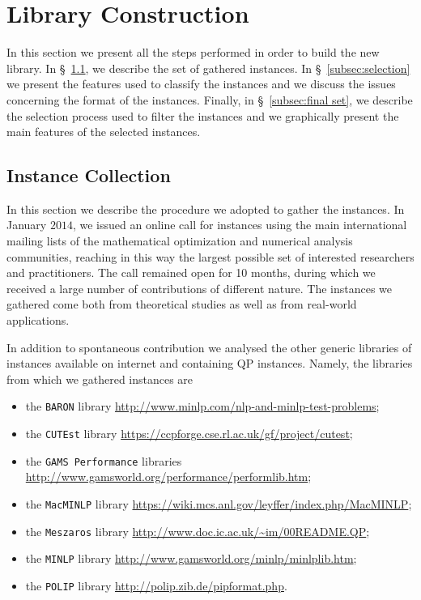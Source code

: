 \section{Library Construction}\label{sec:lib}

In this section we present all the steps performed in order to build the
new library. In \S~\ref{subsec:instColl}, we describe the set of gathered
instances. In \S~\ref{subsec:selection} we present the features used to
classify the instances and we discuss the issues concerning the format of
the instances. Finally, in \S~\ref{subsec:final set}, we describe the
selection process used to filter the instances and we graphically present
the main features of the selected instances.

\subsection{Instance Collection}\label{subsec:instColl}

In this section we describe the procedure we adopted to gather the
instances. In January $2014$, we issued an online call for instances
using the main international mailing lists of the mathematical
optimization and numerical analysis communities, reaching in this way
the largest possible set of interested researchers and practitioners.
The call remained open for 10 months, during which we received a large
number of contributions of different nature. The instances we gathered
come both from theoretical studies as well as from real-world
applications.

In addition to spontaneous contribution we analysed the other generic
libraries of instances available  on internet and containing QP
instances. Namely, the libraries from which we gathered instances are
%
\begin{itemize}
 \item the \texttt{BARON} library
 \url{http://www.minlp.com/nlp-and-minlp-test-problems};
%
\item the \texttt{CUTEst} library
 \url{https://ccpforge.cse.rl.ac.uk/gf/project/cutest};
%
\item the \texttt{GAMS Performance} libraries
 \url{http://www.gamsworld.org/performance/performlib.htm};
%
\item the \texttt{MacMINLP} library
 \url{https://wiki.mcs.anl.gov/leyffer/index.php/MacMINLP};
%
\item the \texttt{Meszaros} library
 \url{http://www.doc.ic.ac.uk/~im/00README.QP};
%
\item the \texttt{MINLP} library
 \url{http://www.gamsworld.org/minlp/minlplib.htm};
%
\item the \texttt{POLIP} library
 \url{http://polip.zib.de/pipformat.php}.
\end{itemize}

